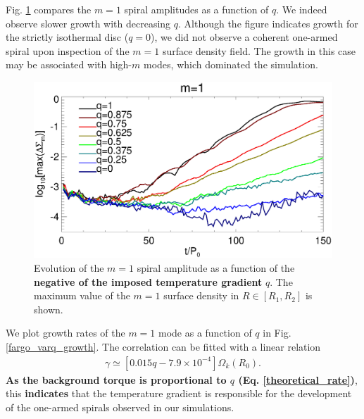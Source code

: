 Fig. \ref{fargo_varq} compares the $m=1$ spiral amplitudes as a
function of $q$. We indeed observe slower growth with decreasing
$q$. Although the figure indicates growth for the strictly isothermal 
disc ($q=0$), we did not observe a coherent one-armed spiral upon
inspection of the $m=1$ surface density field. The growth in this case
may be associated with high-$m$ modes, which dominated the 
simulation.   


\begin{figure}
  \includegraphics[width=\linewidth]{figures/m1_analysis_plot_fargo_varq}   
  \caption{Evolution of the $m=1$ spiral amplitude as a function of
    the {\bf negative of the imposed temperature gradient} $q$. The maximum value of the
    $m=1$ surface density in $R\in[R_1,R_2]$ is shown. 
    \label{fargo_varq}} 
\end{figure}

We plot growth rates of the $m=1$ mode as a function of $q$ in 
Fig. \ref{fargo_varq_growth}. The correlation can be fitted with a 
linear relation
\begin{align*}
  \gamma \simeq \left[0.015 q - 7.9\times10^{-4}\right] \Omega_k(R_0). 
\end{align*}
{\bf As the background torque is proportional to $q$
  (Eq. \ref{theoretical_rate})}, 
this {\bf indicates} that the temperature gradient is responsible for the
development of the one-armed spirals observed in our simulations.  

